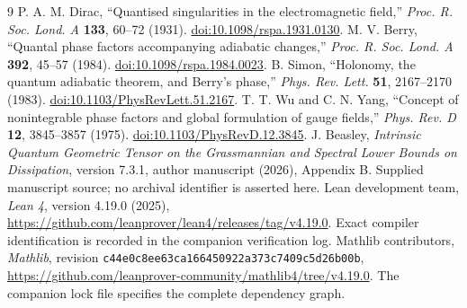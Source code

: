\documentclass[11pt]{article}
\theoremstyle{definition}\newtheorem{definition}[theorem]{Definition}
\theoremstyle{remark}\newtheorem{remark}[theorem]{Remark}
\begin{document}
\begin{thebibliography}{9}
 P. A. M. Dirac, ``Quantised singularities in the electromagnetic field,'' \emph{Proc. R. Soc. Lond. A} \textbf{133}, 60--72 (1931). \href{https://doi.org/10.1098/rspa.1931.0130}{doi:10.1098/rspa.1931.0130}.
 M. V. Berry, ``Quantal phase factors accompanying adiabatic changes,'' \emph{Proc. R. Soc. Lond. A} \textbf{392}, 45--57 (1984). \href{https://doi.org/10.1098/rspa.1984.0023}{doi:10.1098/rspa.1984.0023}.
 B. Simon, ``Holonomy, the quantum adiabatic theorem, and Berry's phase,'' \emph{Phys. Rev. Lett.} \textbf{51}, 2167--2170 (1983). \href{https://doi.org/10.1103/PhysRevLett.51.2167}{doi:10.1103/PhysRevLett.51.2167}.
 T. T. Wu and C. N. Yang, ``Concept of nonintegrable phase factors and global formulation of gauge fields,'' \emph{Phys. Rev. D} \textbf{12}, 3845--3857 (1975). \href{https://doi.org/10.1103/PhysRevD.12.3845}{doi:10.1103/PhysRevD.12.3845}.
 J. Beasley, \emph{Intrinsic Quantum Geometric Tensor on the Grassmannian and Spectral Lower Bounds on Dissipation}, version 7.3.1, author manuscript (2026), Appendix B. Supplied manuscript source; no archival identifier is asserted here.
 Lean development team, \emph{Lean 4}, version 4.19.0 (2025), \url{https://github.com/leanprover/lean4/releases/tag/v4.19.0}. Exact compiler identification is recorded in the companion verification log.
 Mathlib contributors, \emph{Mathlib}, revision \texttt{c44e0c8ee63ca166450922a373c7409c5d26b00b}, \url{https://github.com/leanprover-community/mathlib4/tree/v4.19.0}. The companion lock file specifies the complete dependency graph.
\end{thebibliography}
\end{document}
